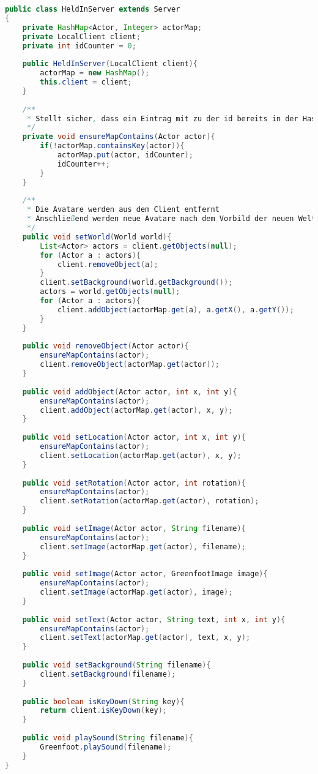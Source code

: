 \documentclass{pi1}
\begin{document}
\begin{lstlisting}[caption={}, firstnumber=9, language=Java]
public class HeldInServer extends Server
{
    private HashMap<Actor, Integer> actorMap;
    private LocalClient client;
    private int idCounter = 0;
    
    public HeldInServer(LocalClient client){
        actorMap = new HashMap();
        this.client = client;
    }
    
    /**
     * Stellt sicher, dass ein Eintrag mit zu der id bereits in der HashMap existiert.
     */
    private void ensureMapContains(Actor actor){
        if(!actorMap.containsKey(actor)){
            actorMap.put(actor, idCounter);
            idCounter++;
        }
    }
    
    /**
     * Die Avatare werden aus dem Client entfernt
     * Anschließend werden neue Avatare nach dem Vorbild der neuen Welt erschaffen.
     */
    public void setWorld(World world){
        List<Actor> actors = client.getObjects(null);
        for (Actor a : actors){
            client.removeObject(a);
        }
        client.setBackground(world.getBackground());
        actors = world.getObjects(null);
        for (Actor a : actors){
            client.addObject(actorMap.get(a), a.getX(), a.getY());
        }
    }
    
    public void removeObject(Actor actor){
        ensureMapContains(actor);
        client.removeObject(actorMap.get(actor));
    }
    
    public void addObject(Actor actor, int x, int y){
        ensureMapContains(actor);
        client.addObject(actorMap.get(actor), x, y);
    }
    
    public void setLocation(Actor actor, int x, int y){
        ensureMapContains(actor);
        client.setLocation(actorMap.get(actor), x, y);
    }
    
    public void setRotation(Actor actor, int rotation){
        ensureMapContains(actor);
        client.setRotation(actorMap.get(actor), rotation);
    }
    
    public void setImage(Actor actor, String filename){
        ensureMapContains(actor);
        client.setImage(actorMap.get(actor), filename);
    }
    
    public void setImage(Actor actor, GreenfootImage image){
        ensureMapContains(actor);
        client.setImage(actorMap.get(actor), image);
    }
    
    public void setText(Actor actor, String text, int x, int y){
        ensureMapContains(actor);
        client.setText(actorMap.get(actor), text, x, y);
    }
    
    public void setBackground(String filename){
        client.setBackground(filename);
    }
    
    public boolean isKeyDown(String key){
        return client.isKeyDown(key);
    }
    
    public void playSound(String filename){
        Greenfoot.playSound(filename);
    }
}
\end{lstlisting}
\end{document}
